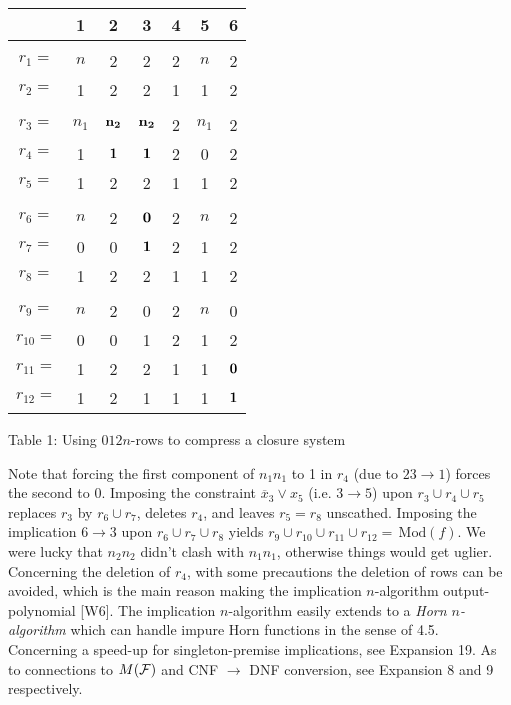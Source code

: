 \documentclass[11pt]{article}
\newcommand{\ol}{\overline}
\newcommand{\ra}{\rightarrow}
\begin{document}
\begin{tabular}{c|c|c|c|c|c|c|}
& 1 & 2 & 3 & 4 & 5 & 6 \\ \hline
& & & & &     &\\ \hline
$r_1=$ & $n$ & 2 & 2 & 2& $n$ & 2\\ \hline
$r_2=$ & 1 & 2 & 2 & 1 & 1& 2\\ \hline
& & & & & & \\ \hline
$r_3=$ & $n_1$ & ${\bf n_2}$ & ${\bf n_2}$ & 2 & $n_1$ & 2\\ \hline
$r_4=$ & 1 & ${\bf 1}$ & ${\bf 1}$ & 2 & 0 & 2 \\ \hline
$r_5=$ & 1 & 2& 2 & 1 & 1& 2 \\ \hline
 & & & & & & \\ \hline
 $r_6=$ & $n$ & 2 & ${\bf 0}$ & 2 & $n$ & 2 \\ \hline
 $r_7=$ & 0 & 0 & ${\bf 1}$ & 2 & 1 & 2\\ \hline
 $r_8=$ & 1 & 2& 2& 1 & 1& 2 \\ \hline
  & & & & & & \\ \hline
$r_9=$ & $n$ & 2 & 0 & 2 & $n$ & 0\\ \hline
$r_{10}=$ & 0 & 0 & 1 & 2& 1 & 2\\ \hline
$r_{11}=$ & 1& 2 & 2 & 1& 1& ${\bf 0}$ \\ \hline
$r_{12}=$ & 1 & 2& 1 & 1 & 1& ${\bf 1}$ \\ \hline   \end{tabular}

Table 1: Using $012n$-rows to compress a closure system

Note that forcing the first component of $n_1 n_1$ to 1 in $r_4$ (due to $23 \ra 1$) forces the second to 0. Imposing the constraint $\ol{x}_3 \vee x_5$ (i.e. $3 \ra 5$) upon $r_3 \cup r_4 \cup r_5$ replaces $r_3$ by $r_6 \cup r_7$, deletes $r_4$, and leaves $r_5= r_8$ unscathed. Imposing the implication $6 \ra 3$ upon $r_6 \cup r_7 \cup r_8$ yields $r_9 \cup r_{10} \cup r_{11} \cup r_{12} = \, \mbox{Mod}(f)$. We were lucky that $n_2 n_2$ didn't clash with $n_1n_1$, otherwise things  would get uglier. Concerning the deletion of $r_4$, with some precautions the deletion of rows can be avoided, which is the main reason making the implication $n$-algorithm output-polynomial [W6]. The implication $n$-algorithm easily extends to a {\it Horn $n$-algorithm} which can handle impure Horn functions in the sense of 4.5.  Concerning a speed-up for singleton-premise implications, see Expansion 19. As to connections to $M({\cal F})$ and CNF $\ra$ DNF conversion, see Expansion 8 and 9 respectively.
\end{document}
